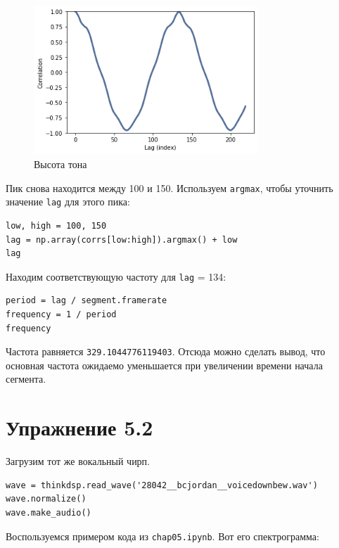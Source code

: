 \documentclass[a4paper,12pt]{report}
\begin{document}
\begin{figure}[H]
        \centering
        \includegraphics[width=0.75\textwidth]{lab5_fig1_2.png}
        \caption{Высота тона}
        \label{fig:lab5_fig1_2}
\end{figure}

Пик снова находится между 100 и 150. Используем \texttt{argmax}, чтобы уточнить значение \texttt{lag} для этого пика:

\begin{lstlisting}[caption=Нахождение \texttt{lag}]
low, high = 100, 150
lag = np.array(corrs[low:high]).argmax() + low
lag
\end{lstlisting}

Находим соответствующую частоту для \texttt{lag} = 134:

\begin{lstlisting}[caption=Нахождение частоты]
period = lag / segment.framerate
frequency = 1 / period
frequency
\end{lstlisting}

Частота равняется \texttt{329.1044776119403}. Отсюда можно сделать вывод, что основная частота ожидаемо уменьшается при увеличении времени начала сегмента.

\chapter{Упражнение 5.2}

Загрузим тот же вокальный чирп.

\begin{lstlisting}[caption=Загрузка звука]
wave = thinkdsp.read_wave('28042__bcjordan__voicedownbew.wav')
wave.normalize()
wave.make_audio()
\end{lstlisting}

Воспользуемся примером кода из \texttt{chap05.ipynb}. Вот его спектрограмма:
\end{document}
